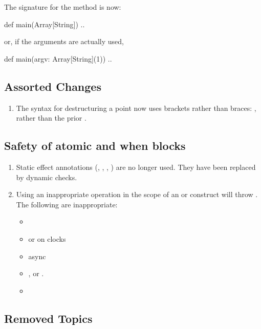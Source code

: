 The signature for the  method is now: 
\begin{xten}
           def main(Array[String]) {..}
\end{xten}
or, if the arguments are actually used, 
\begin{xten}
           def main(argv: Array[String](1)) {..}
\end{xten}

\subsection{Assorted Changes}


\begin{enumerate}
\item The syntax for destructuring a point now uses brackets rather than
      braces: , rather than the prior .  
\end{enumerate}

\subsection{Safety of atomic and when blocks}


\begin{enumerate}
\item Static effect annotations (, ,
      , ) are no longer used. They have been
      replaced by dynamic checks.
\item Using an inappropriate operation in the scope of an  or
       construct will throw .  
      The following are inappropriate:      
      \begin{itemize}
      \item {}
      \item {} or  on clocks
      \item async
      \item {}, or .
      \item {}
      \end{itemize}

\end{enumerate}


\subsection{Removed Topics}

